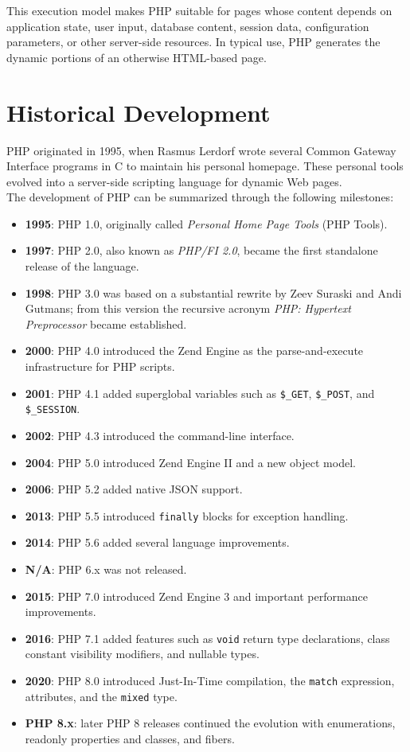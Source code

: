 \documentclass{scrbook}
\begin{document}
	This execution model makes PHP suitable for pages whose content depends on application state, user input, database content, session data, configuration parameters, or other server-side resources. In typical use, PHP generates the dynamic portions of an otherwise HTML-based page.
	
	\section{Historical Development}
	
	PHP originated in 1995, when Rasmus Lerdorf wrote several Common Gateway Interface programs in C to maintain his personal homepage. These personal tools evolved into a server-side scripting language for dynamic Web pages.\\
	
	The development of PHP can be summarized through the following milestones:
	
	\begin{itemize}
		\item \textbf{1995}: PHP 1.0, originally called \emph{Personal Home Page Tools} (PHP Tools).
		\item \textbf{1997}: PHP 2.0, also known as \emph{PHP/FI 2.0}, became the first standalone release of the language.
		\item \textbf{1998}: PHP 3.0 was based on a substantial rewrite by Zeev Suraski and Andi Gutmans; from this version the recursive acronym \emph{PHP: Hypertext Preprocessor} became established.
		\item \textbf{2000}: PHP 4.0 introduced the Zend Engine as the parse-and-execute infrastructure for PHP scripts.
		\item \textbf{2001}: PHP 4.1 added superglobal variables such as \texttt{\$\_GET}, \texttt{\$\_POST}, and \texttt{\$\_SESSION}.
		\item \textbf{2002}: PHP 4.3 introduced the command-line interface.
		\item \textbf{2004}: PHP 5.0 introduced Zend Engine II and a new object model.
		\item \textbf{2006}: PHP 5.2 added native JSON support.
		\item \textbf{2013}: PHP 5.5 introduced \texttt{finally} blocks for exception handling.
		\item \textbf{2014}: PHP 5.6 added several language improvements.
		\item \textbf{N/A}: PHP 6.x was not released.
		\item \textbf{2015}: PHP 7.0 introduced Zend Engine 3 and important performance improvements.
		\item \textbf{2016}: PHP 7.1 added features such as \texttt{void} return type declarations, class constant visibility modifiers, and nullable types.
		\item \textbf{2020}: PHP 8.0 introduced Just-In-Time compilation, the \texttt{match} expression, attributes, and the \texttt{mixed} type.
		\item \textbf{PHP 8.x}: later PHP 8 releases continued the evolution with enumerations, readonly properties and classes, and fibers.
	\end{itemize}
	
\end{document}
